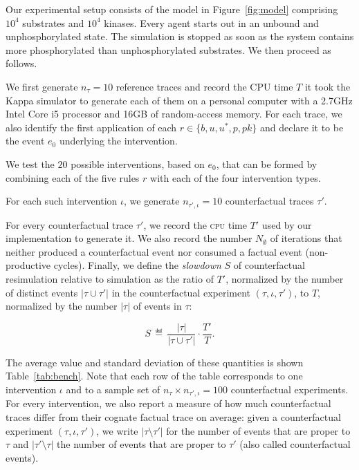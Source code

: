 Our experimental setup consists of the model in Figure~\ref{fig:model} comprising $10^4$ substrates and $10^4$ kinases. Every agent starts out in an unbound and unphosphorylated state. The simulation is stopped as soon as the system contains more phosphorylated than unphosphorylated substrates. We then proceed as follows.
\begin{inparaenum}[(i)]
\item We first generate $n_{\tau}=10$ reference traces and record the
  CPU time $T$ it took the Kappa simulator to generate each of them on
  a personal computer with a 2.7GHz Intel Core i5 processor and 16GB
  of random-access memory.  For each trace, we also identify the first
  application of each $r\in\{b,u,u^{\ast},p,pk\}$ and declare it to be
  the event $e_0$ underlying the intervention.
\item We test the $20$ possible interventions, based on $e_0$, that
  can be formed by combining each of the five rules $r$ with each of
  the four intervention types.
\item For each such intervention $\iota$, we generate
  $n_{\tau',\iota} = 10$ counterfactual traces $\tau'$.
\item For every counterfactual trace $\tau'$, we record the
  \textsc{cpu} time $T'$ used by our implementation to generate it. We
  also record the number $N_{\emptyset}$ of iterations that neither
  produced a counterfactual event nor consumed a factual event
  (non-productive cycles).  Finally, we define the \textit{slowdown}
  $S$ of counterfactual resimulation relative to simulation as the
  ratio of $T'$, normalized by the number of distinct events
  $|\tau \cup \tau'|$ in the counterfactual experiment
  $(\tau, \iota, \tau')$, to $T$, normalized by the number $|\tau|$ of
  events in $\tau$:
  \vspace{-0.15cm}
  \begin{small}
    \begin{equation*}
      S \,\eqdef\, \frac{|\tau|}{|\tau \cup \tau'|} \cdot\frac{T'}{T}.
    \end{equation*}
  \end{small}
  The average value and standard deviation of these quantities is
  shown Table~\ref{tab:bench}. Note that each row of the table
  corresponds to one intervention $\iota$ and to a sample set of
  $n_{\tau} \times n_{\tau',\iota} = 100$ counterfactual
  experiments. For every intervention, we also report a measure of how
  much counterfactual traces differ from their cognate factual trace
  on average: given a counterfactual experiment
  $(\tau, \iota, \tau')$, we write $|\tau \!\setminus\! \tau'|$ for
  the number of events that are proper to $\tau$ and
  $|\tau' \!\setminus\! \tau|$ the number of events that are proper to
  $\tau'$ (also called counterfactual events).
\end{inparaenum}

